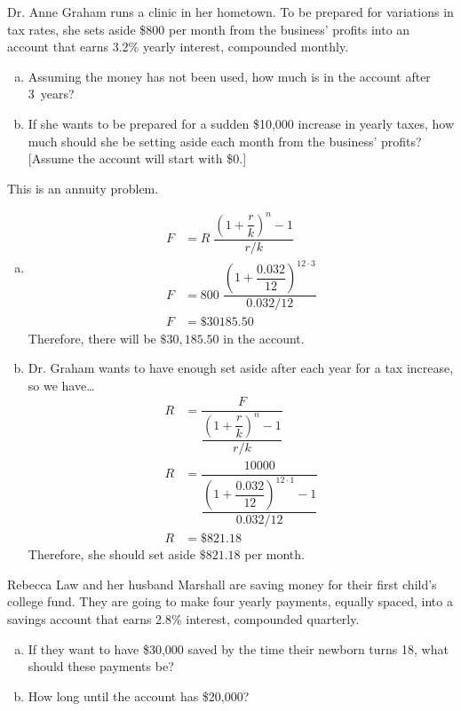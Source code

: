 \documentclass[11pt,letterpaper]{article}
\begin{document}

 Dr. Anne Graham runs a clinic in her hometown. To be prepared for variations in tax rates, she sets aside \$800 per month from the business' profits into an account that earns 3.2\% yearly interest, compounded monthly. 
\begin{enumerate}[(a)]
\item Assuming the money has not been used, how much is in the account after 3~years?
\item If she wants to be prepared for a sudden \$10,000 increase in yearly taxes, how much should she be setting aside each month from the business' profits? [Assume the account will start with \$0.]
\end{enumerate} \pspace

\sol This is an annuity problem. 
\begin{enumerate}[(a)]
\item 
	\[
	\begin{aligned}
	F&= R \; \dfrac{\left(1 + \dfrac{r}{k} \right)^n - 1}{r/k} \\
	F&= 800\; \dfrac{\left(1 + \dfrac{0.032}{12} \right)^{12 \cdot 3}}{0.032/12} \\
	F&= \$30185.50
	\end{aligned}
	\]
Therefore, there will be $\$30,185.50$ in the account. \pspace

\item Dr. Graham wants to have enough set aside after each year for a tax increase, so we have\dots
	\[
	\begin{aligned}
	R&= \dfrac{F}{\dfrac{\left(1 + \dfrac{r}{k} \right)^n - 1}{r/k}} \\
	R&= \dfrac{10000}{\dfrac{\left(1 + \dfrac{0.032}{12} \right)^{12 \cdot 1} - 1}{0.032/12}} \\
	R&= \$821.18
	\end{aligned}
	\]
Therefore, she should set aside $\$821.18$ per month. 
\end{enumerate}





\newpage





 Rebecca Law and her husband Marshall are saving money for their first child's college fund. They are going to make four yearly payments, equally spaced, into a savings account that earns 2.8\% interest, compounded quarterly. 
\begin{enumerate}[(a)]
\item If they want to have \$30,000 saved by the time their newborn turns 18, what should these payments be?
\item How long until the account has \$20,000?
\end{enumerate} \pspace
\end{document}
